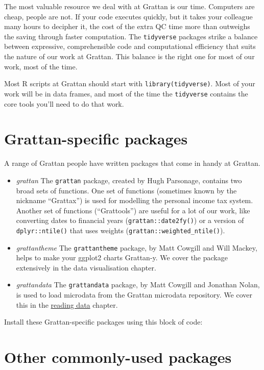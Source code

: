 \documentclass[]{book}
\begin{document}
The most valuable resource we deal with at Grattan is our time. Computers are cheap, people are not. If your code executes quickly, but it takes your colleague many hours to decipher it, the cost of the extra QC time more than outweighs the saving through faster computation. The \texttt{tidyverse} packages strike a balance between expressive, comprehensible code and computational efficiency that suits the nature of our work at Grattan. This balance is the right one for most of our work, most of the time.

Most R scripts at Grattan should start with \texttt{library(tidyverse)}. Most of your work will be in data frames, and most of the time the \texttt{tidyverse} contains the core tools you'll need to do that work.

\hypertarget{grattan-specific-packages}{%
\section{Grattan-specific packages}\label{grattan-specific-packages}}

A range of Grattan people have written packages that come in handy at Grattan.

\begin{itemize}
\item
  \emph{grattan} The \texttt{grattan} package, created by Hugh Parsonage, contains two broad sets of functions. One set of functions (sometimes known by the nickname ``Grattax'') is used for modelling the personal income tax system. Another set of functions (``Grattools'') are useful for a lot of our work, like converting dates to financial years (\texttt{grattan::date2fy()}) or a version of \texttt{dplyr::ntile()} that uses weights (\texttt{grattan::weighted\_ntile()}).
\item
  \emph{grattantheme} The \texttt{grattantheme} package, by Matt Cowgill and Will Mackey, helps to make your ggplot2 charts Grattan-y. We cover the package extensively in the data visualisation chapter.
\item
  \emph{grattandata} The \texttt{grattandata} package, by Matt Cowgill and Jonathan Nolan, is used to load microdata from the Grattan microdata repository. We cover this in the \protect\hyperlink{reading-data}{reading data} chapter.
\end{itemize}

Install these Grattan-specific packages using this block of code:

\hypertarget{other-commonly-used-packages}{%
\section{Other commonly-used packages}\label{other-commonly-used-packages}}
\end{document}
